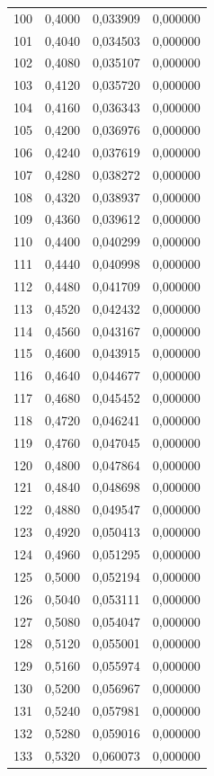 \begin{tabular}{lrrr}
100 & 0,4000 & 0,033909 & 0,000000 \\
101 & 0,4040 & 0,034503 & 0,000000 \\
102 & 0,4080 & 0,035107 & 0,000000 \\
103 & 0,4120 & 0,035720 & 0,000000 \\
104 & 0,4160 & 0,036343 & 0,000000 \\
105 & 0,4200 & 0,036976 & 0,000000 \\
106 & 0,4240 & 0,037619 & 0,000000 \\
107 & 0,4280 & 0,038272 & 0,000000 \\
108 & 0,4320 & 0,038937 & 0,000000 \\
109 & 0,4360 & 0,039612 & 0,000000 \\
110 & 0,4400 & 0,040299 & 0,000000 \\
111 & 0,4440 & 0,040998 & 0,000000 \\
112 & 0,4480 & 0,041709 & 0,000000 \\
113 & 0,4520 & 0,042432 & 0,000000 \\
114 & 0,4560 & 0,043167 & 0,000000 \\
115 & 0,4600 & 0,043915 & 0,000000 \\
116 & 0,4640 & 0,044677 & 0,000000 \\
117 & 0,4680 & 0,045452 & 0,000000 \\
118 & 0,4720 & 0,046241 & 0,000000 \\
119 & 0,4760 & 0,047045 & 0,000000 \\
120 & 0,4800 & 0,047864 & 0,000000 \\
121 & 0,4840 & 0,048698 & 0,000000 \\
122 & 0,4880 & 0,049547 & 0,000000 \\
123 & 0,4920 & 0,050413 & 0,000000 \\
124 & 0,4960 & 0,051295 & 0,000000 \\
125 & 0,5000 & 0,052194 & 0,000000 \\
126 & 0,5040 & 0,053111 & 0,000000 \\
127 & 0,5080 & 0,054047 & 0,000000 \\
128 & 0,5120 & 0,055001 & 0,000000 \\
129 & 0,5160 & 0,055974 & 0,000000 \\
130 & 0,5200 & 0,056967 & 0,000000 \\
131 & 0,5240 & 0,057981 & 0,000000 \\
132 & 0,5280 & 0,059016 & 0,000000 \\
133 & 0,5320 & 0,060073 & 0,000000 \\

\end{tabular}
